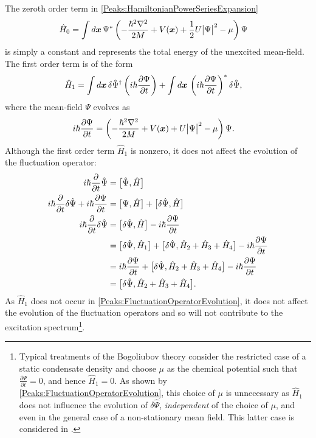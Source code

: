 The zeroth order term in \eqref{Peaks:HamiltonianPowerSeriesExpansion}
\begin{align}
    \hat{H}_0 &= \int d \bm{x}\, \Psi^* \left( -\frac{\hbar^2 \nabla^2}{2M} + V(\bm{x}) + \frac{1}{2} U \big|\Psi\big|^2 - \mu \right) \Psi
\end{align}
is simply a constant and represents the total energy of the unexcited mean-field. The first order term is of the form
\begin{align}
    \hat{H}_1 &= \int d \bm{x}\, \delta \hat{\Psi}^\dagger \left(i \hbar \frac{\partial \Psi}{\partial t} \right)  + \int d \bm{x}\, \left(i \hbar \frac{\partial \Psi}{\partial t} \right)^* \delta \hat{\Psi},
\end{align}
where the mean-field $\Psi$ evolves as
\begin{align}
    i \hbar \frac{\partial\Psi}{\partial t} &= \left(-\frac{\hbar^2 \nabla^2}{2 M} + V(\bm{x}) + U \big| \Psi\big|^2 - \mu \right) \Psi.
\end{align}
Although the first order term $\hat{H}_1$ is nonzero, it does not affect the evolution of the fluctuation operator:
\begin{align}
    i \hbar \frac{\partial }{\partial t}\hat{\Psi} &= \comm{\hat{\Psi}, \hat{H}} \notag\\
    i \hbar \frac{\partial }{\partial t}\delta{\hat{\Psi}} + i \hbar \frac{\partial \Psi}{\partial t} &= \comm{\Psi, \hat{H}} + \comm{\delta\hat{\Psi}, \hat{H}} \notag\\
    i \hbar \frac{\partial }{\partial t}\delta \hat{\Psi} &= \comm{\delta \hat{\Psi}, \hat{H}} - i \hbar \frac{\partial  \Psi}{\partial t} \notag\\
    &= \comm{\delta \hat{\Psi}, \hat{H}_1} + \comm{\delta \hat{\Psi}, \hat{H}_2 + \hat{H}_3 + \hat{H}_4} - i \hbar \frac{\partial\Psi }{\partial t} \notag\\
    &= i \hbar \frac{\partial \Psi}{\partial t} + \comm{\delta \hat{\Psi}, \hat{H}_2 + \hat{H}_3 + \hat{H}_4} - i \hbar \frac{\partial \Psi}{\partial t} \notag\\
    &= \comm{\delta \hat{\Psi}, \hat{H}_2 + \hat{H}_3 + \hat{H}_4}. \label{Peaks:FluctuationOperatorEvolution}
\end{align}
As $\hat{H}_1$ does not occur in \eqref{Peaks:FluctuationOperatorEvolution}, it does not affect the evolution of the fluctuation operators and so will not contribute to the excitation spectrum\footnote{Typical treatments of the Bogoliubov theory consider the restricted case of a static condensate density and choose $\mu$ as the chemical potential such that $\displaystyle \frac{\partial \Psi}{\partial t} = 0$, and hence $\hat{H}_1=0$. As shown by \eqref{Peaks:FluctuationOperatorEvolution}, this choice of $\mu$ is unnecessary as $\hat{H}_1$ does not influence the evolution of $\delta\hat{\Psi}$, \emph{independent} of the choice of $\mu$, and even in the general case of a non-stationary mean field. This latter case is considered in .}.

